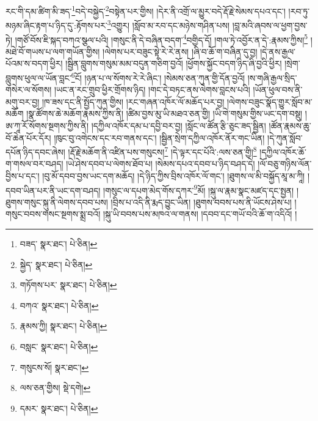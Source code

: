 རང་གི་དམ་ཚིག་མི་ཟད་\footnote{བཟད་  སྣར་ཐང་།  པེ་ཅིན། }བདེ་བསྐྱེད་\footnote{སྐྱེད་  སྣར་ཐང་།  པེ་ཅིན། }བསྟེན་པར་གྱིས། །དེར་ནི་འགྲོ་ལ་མྱུར་བདེ་རྡོ་རྗེ་སེམས་དཔའ་དང་། །རབ་ཏུ་མཉམ་ཞིང་རྟག་པ་ཉིད་དུ་:རྟོགས་པར་\footnote{གཏོགས་པར་  སྣར་ཐང་།  པེ་ཅིན། }འགྱུར། །སློབ་མ་རབ་དང་མཉེས་གཤིན་པས། །བླ་མའི་ཞབས་ལ་ཕྱག་བྱས་ཏེ། །གཙོ་བོས་ཇི་སྐད་བཀའ་སྩལ་པའི། །གསུང་ནི་དེ་བཞིན་བདག་\footnote{བཀའ་  སྣར་ཐང་།  པེ་ཅིན། }བགྱིད་དོ། །གལ་ཏེ་འབྱོར་ན་དེ་:རྣམས་ཀྱིས།\footnote{རྣམས་ཀྱི།  སྣར་ཐང་།  པེ་ཅིན། } །མཐེ་བོ་གཡས་པ་ལག་གཡོན་གྱིས། །ལེགས་པར་བཟུང་སྟེ་རེ་རེ་ནས། །ཞི་བ་ཆོ་ག་བཞིན་དུ་བྱ། །དེ་ནས་རྒྱལ་པོའམ་ས་བདག་ཕྱིར། །སྦྱིན་བླུགས་གསུམ་མམ་བདུན་གཅིག་བྱའོ། །ཕྱོགས་སྐྱོང་བདག་ཉིད་ཞི་བྱའི་ཕྱིར། །སྲེག་བླུགས་ཕུལ་ལ་ཡོན་བླང་\footnote{བསླང་  སྣར་ཐང་།  པེ་ཅིན། }ངོ། །ཉན་པ་ལ་སོགས་རེ་རེ་ཞིང་། །སེམས་ཅན་ཀུན་གྱི་དོན་བྱའོ། །ས་གཞི་རྒྱལ་སྲིད་གསེར་ལ་སོགས། །ཡང་ན་རང་གྲུབ་ཕྱིར་གྲོགས་ཉིད། །གང་དེ་བཏང་ནས་ལེགས་བླངས་པའི། །ཡོན་ཕུལ་བས་ནི་མགུ་བར་བྱ། །ཁ་ཟས་དང་ནི་སྤྱོད་ཀུན་གྱིས། །རང་གཞན་འཁོར་ལོ་མཆོད་པར་བྱ། །ལེགས་བཟུང་སྣོད་གྱུར་སློབ་མ་མཆོག །སྣ་ཚོགས་ཆེ་མཆོག་རྣམས་ཀྱིས་ནི། །ཚིམ་བྱས་མུ་ཡི་མཐའ་ཅན་གྱི། །ཡི་གེ་གསུམ་གྱིས་ཡང་དག་བསྡུ། །ཨ་ཀཱ་རོ་སོགས་སྔགས་ཀྱིས་ནི། །དཀྱིལ་འཁོར་དམ་པ་དབྱི་བར་བྱ། །སློང་ལ་ཚོན་རྩི་ཅུང་ཟད་སྦྱིན། །ཚོན་རྣམས་ཆུ་བོ་ཆེན་པོར་དོར། །ཁུང་བུ་འགེངས་དང་རབ་གནས་དང་། །སྦྱིན་སྲེག་དཀྱིལ་འཁོར་ནོར་གང་ཡིན། །དེ་ཀུན་སློབ་དཔོན་ཉིད་དབང་ཞེས། །རྡོ་རྗེ་མཆོག་ནི་འཛིན་པས་གསུངས།\footnote{གསུངས་སོ།  སྣར་ཐང་། } །དེ་ལྟར་དང་པོའི་:ལས་ཅན་གྱི།\footnote{ལས་ཅན་གྱིས།  སྡེ་དགེ། } །དཀྱིལ་འཁོར་ཆོ་ག་གསལ་བར་བཤད། །ཡེ་ཤེས་དབབ་པ་ལེགས་ཐོབ་པ། །སེམས་དཔའ་དབབ་པ་ཉིད་བཤད་དེ། །ལོ་བཅུ་གཉིས་ལོན་བྱིས་པ་དང་། །བུ་མོ་དབབ་བྱས་ཡང་དག་མཆོད། །དེ་ཉིད་ཀྱིས་བྲིས་འཁོར་ལོ་གང་། །ཐུགས་ལ་མི་བསྐྱོད་མཱ་མ་ཀཱི། །དབབ་ཡིན་པར་ནི་ཡང་དག་བཤད། །གསུང་ལ་དཔག་མེད་གོས་དཀར་\footnote{དམར་  སྣར་ཐང་།  པེ་ཅིན། }མོ། །སྐུ་ལ་རྣམ་སྣང་མཛད་དང་སྤྱན། །ཐུགས་གསུང་སྐུ་ནི་ལེགས་དབབ་པས། །བྲིས་པ་འདི་ནི་རྨད་བྱུང་ཡིན། །ཐུགས་བབས་པས་ནི་ཡོངས་ཤེས་པ། །གསུང་བབས་གསང་སྔགས་སྨྲ་བའོ། །སྐུ་ཡི་བབས་པས་མཁའ་ལ་གནས། །དབབ་དང་གཡོ་བའི་ཆོ་ག་འདིའོ། །
